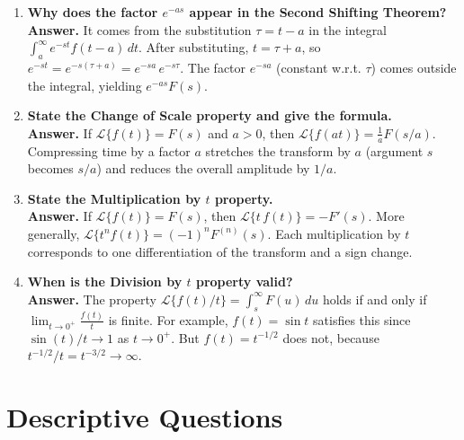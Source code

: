 \documentclass[12pt,a4paper]{article}
\begin{document}
\begin{enumerate}
\item \textbf{Why does the factor $e^{-as}$ appear in the Second Shifting Theorem?}\\
\textbf{Answer.} It comes from the substitution $\tau = t - a$ in the integral
$\int_a^\infty e^{-st}f(t-a)\,dt$. After substituting, $t = \tau + a$, so
$e^{-st} = e^{-s(\tau+a)} = e^{-sa}\,e^{-s\tau}$. The factor $e^{-sa}$ (constant w.r.t.
$\tau$) comes outside the integral, yielding $e^{-as}F(s)$.

\item \textbf{State the Change of Scale property and give the formula.}\\
\textbf{Answer.} If $\mathcal{L}\{f(t)\} = F(s)$ and $a > 0$, then
$\mathcal{L}\{f(at)\} = \tfrac{1}{a}F(s/a).$
Compressing time by a factor $a$ stretches the transform by $a$ (argument $s$ becomes $s/a$)
and reduces the overall amplitude by $1/a$.

\item \textbf{State the Multiplication by $t$ property.}\\
\textbf{Answer.} If $\mathcal{L}\{f(t)\} = F(s)$, then $\mathcal{L}\{t\,f(t)\} = -F'(s).$
More generally, $\mathcal{L}\{t^n f(t)\} = (-1)^n F^{(n)}(s).$ Each multiplication by $t$
corresponds to one differentiation of the transform and a sign change.

\item \textbf{When is the Division by $t$ property valid?}\\
\textbf{Answer.} The property $\mathcal{L}\{f(t)/t\} = \int_s^\infty F(u)\,du$ holds if and only
if $\displaystyle\lim_{t\to 0^+}\frac{f(t)}{t}$ is finite. For example, $f(t) = \sin t$ satisfies
this since $\sin(t)/t \to 1$ as $t \to 0^+$. But $f(t) = t^{-1/2}$ does not, because
$t^{-1/2}/t = t^{-3/2} \to \infty$.

\end{enumerate}

\section{Descriptive Questions}
\end{document}
